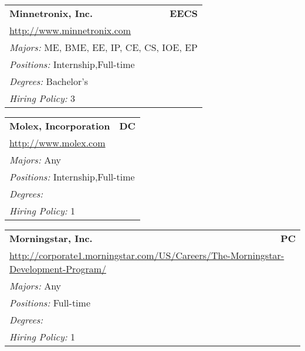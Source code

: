\documentclass[twoside]{article}
\begin{document}
\begin{center}
\begin{multicols}{3}
\begin{FlushLeft}
\begin{minipage}{\columnwidth}
\end{minipage}
 
\begin{minipage}{\columnwidth}\begin{tabularx}{.95\columnwidth}{Xr}
                 {\Large\bf Minnetronix, Inc.} & {\Large\bf EECS}\\
    \multicolumn{2}{p{.95\columnwidth}}{\url{http://www.minnetronix.com}}\\
    \multicolumn{2}{p{.95\columnwidth}}{\emph{Majors:} ME, BME, EE, IP, CE, CS, IOE, EP}\\
    \multicolumn{2}{p{.95\columnwidth}}{\emph{Positions:} Internship,Full-time}\\
    \multicolumn{2}{p{.95\columnwidth}}{\emph{Degrees:} Bachelor's}\\
    \multicolumn{2}{p{.95\columnwidth}}{\emph{Hiring Policy:} 3}\\
    \end{tabularx}
    
\end{minipage}
 
\begin{minipage}{\columnwidth}\begin{tabularx}{.95\columnwidth}{Xr}
                 {\Large\bf Molex, Incorporation} & {\Large\bf DC}\\
    \multicolumn{2}{p{.95\columnwidth}}{\url{http://www.molex.com}}\\
    \multicolumn{2}{p{.95\columnwidth}}{\emph{Majors:} Any}\\
    \multicolumn{2}{p{.95\columnwidth}}{\emph{Positions:} Internship,Full-time}\\
    \multicolumn{2}{p{.95\columnwidth}}{\emph{Degrees:} }\\
    \multicolumn{2}{p{.95\columnwidth}}{\emph{Hiring Policy:} 1}\\
    \end{tabularx}
    
\end{minipage}
 
\begin{minipage}{\columnwidth}\begin{tabularx}{.95\columnwidth}{Xr}
                 {\Large\bf Morningstar, Inc.} & {\Large\bf PC}\\
    \multicolumn{2}{p{.95\columnwidth}}{\url{http://corporate1.morningstar.com/US/Careers/The-Morningstar-Development-Program/}}\\
    \multicolumn{2}{p{.95\columnwidth}}{\emph{Majors:} Any}\\
    \multicolumn{2}{p{.95\columnwidth}}{\emph{Positions:} Full-time}\\
    \multicolumn{2}{p{.95\columnwidth}}{\emph{Degrees:} }\\
    \multicolumn{2}{p{.95\columnwidth}}{\emph{Hiring Policy:} 1}\\
    \end{tabularx}
    

\end{minipage}
\end{FlushLeft}
\end{multicols}
\end{center}
\end{document}
